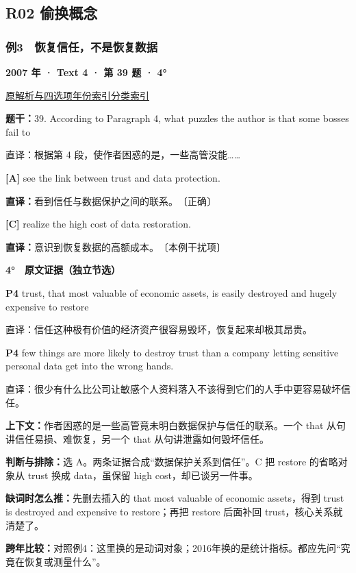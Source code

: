 \documentclass[11pt,a4paper]{article}
\begin{document}
\subsection{R02 偷换概念}
\subsubsection{例3　恢复信任，不是恢复数据}\label{case-2007-T4-Q39}
\noindent\textbf{2007 年 · Text 4 · 第 39 题 · 4°}\par\noindent \href{https://zj139.github.io/math-notes/english/4583f11cfad63caee815e722/\#q39}{原解析与四选项}\quad \hyperref[idx-2007-T4-Q39]{年份索引}\quad \hyperref[class-R02]{分类索引}\par\smallskip
\noindent\textbf{题干：}39. According to Paragraph 4, what puzzles the author is that some bosses fail to\par
直译：根据第 4 段，使作者困惑的是，一些高管没能……\par
{}\noindent\textbf{[A]} see the link between trust and data protection.\par\nopagebreak
\noindent\textbf{直译：}看到信任与数据保护之间的联系。　〔正确〕\par
{}\noindent\textbf{[C]} realize the high cost of data restoration.\par\nopagebreak
\noindent\textbf{直译：}意识到恢复数据的高额成本。　〔本例干扰项〕\par
\begin{evidence}\textbf{4°　原文证据（独立节选）}\par
\textbf{P4} trust, that most valuable of economic assets, is easily destroyed and hugely expensive to restore\par 直译：信任这种极有价值的经济资产很容易毁坏，恢复起来却极其昂贵。\par
\textbf{P4} few things are more likely to destroy trust than a company letting sensitive personal data get into the wrong hands.\par 直译：很少有什么比公司让敏感个人资料落入不该得到它们的人手中更容易破坏信任。\par
\end{evidence}
\noindent\textbf{上下文：}作者困惑的是一些高管竟未明白数据保护与信任的联系。一个 that 从句讲信任易损、难恢复，另一个 that 从句讲泄露如何毁坏信任。\par
\noindent\textbf{判断与排除：}选 A。两条证据合成“数据保护关系到信任”。C 把 restore 的省略对象从 trust 换成 data，虽保留 high cost，却已谈另一件事。\par
\noindent\textbf{缺词时怎么推：}先删去插入的 that most valuable of economic assets，得到 trust is destroyed and expensive to restore；再把 restore 后面补回 trust，核心关系就清楚了。\par
\noindent\textbf{跨年比较：}对照例4：这里换的是动词对象；2016年换的是统计指标。都应先问“究竟在恢复或测量什么”。\par
\clearpage
\end{document}
